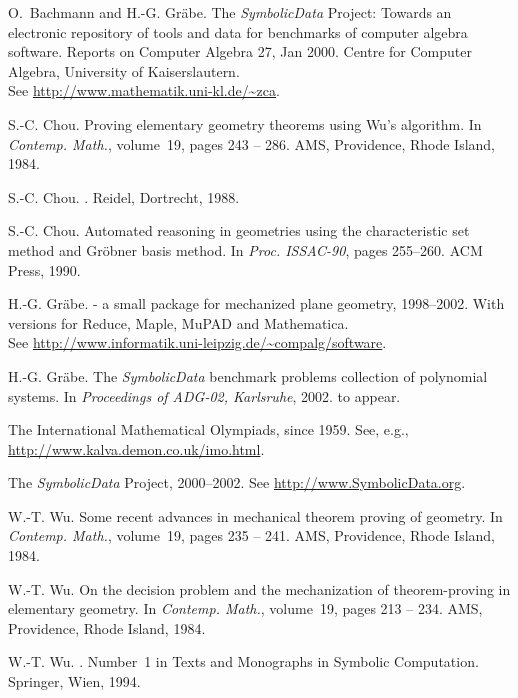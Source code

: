 \documentclass[11pt]{article}
\newcommand{\SD}{{\it Symbo\-lic\-Data}}
\begin{document}
 
\begin{thebibliography}{10}

O.~Bachmann and H.-G. Gr\"{a}be.
\newblock The {\SD} {P}roject: Towards an electronic repository of tools and
  data for benchmarks of computer algebra software.
\newblock Reports on Computer Algebra 27, Jan 2000.
\newblock Centre for Computer Algebra, University of Kaiserslautern.\\ See
  \url{http://www.mathematik.uni-kl.de/~zca}.

S.-C. Chou.
\newblock Proving elementary geometry theorems using {Wu's} algorithm.
\newblock In {\em Contemp. Math.}, volume~19, pages 243 -- 286. AMS,
  Providence, Rhode Island, 1984.

S.-C. Chou.
.
\newblock Reidel, Dortrecht, 1988.

S.-C. Chou.
\newblock Automated reasoning in geometries using the characteristic set method
  and {Gr\"obner} basis method.
\newblock In {\em Proc. ISSAC-90}, pages 255--260. ACM Press, 1990.

H.-G. Gr\"abe.
 - a small package for mecha\-nized plane geo\-metry,
  1998--2002.
\newblock With versions for Reduce, Maple, MuPAD and Mathematica. \\ See
  \url{http://www.informatik.uni-leipzig.de/~compalg/software}.

H.-G. Gr\"abe.
\newblock The {\SD} benchmark problems collection of polynomial systems.
\newblock In {\em Proceedings of ADG-02, Karlsruhe}, 2002.
\newblock to appear.

{The International Mathematical Olympiads}, since 1959.
\newblock \newline See, e.g., \url{http://www.kalva.demon.co.uk/imo.html}.

{The {\SD} Project}, 2000--2002.
\newblock \newline See \url{http://www.SymbolicData.org}.

W.-T. Wu.
\newblock Some recent advances in mechanical theorem proving of geometry.
\newblock In {\em Contemp. Math.}, volume~19, pages 235 -- 241. AMS,
  Providence, Rhode Island, 1984.

W.-T. Wu.
\newblock On the decision problem and the mechanization of theorem-proving in
  elementary geometry.
\newblock In {\em Contemp. Math.}, volume~19, pages 213 -- 234. AMS,
  Providence, Rhode Island, 1984.

W.-T. Wu.
.
\newblock Number~1 in Texts and Monographs in Symbolic Computation. Springer,
  Wien, 1994.

\end{thebibliography}


%
\end{document}

